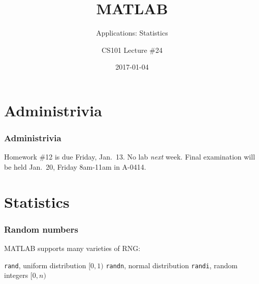 \documentclass[11pt]{beamer}
\title{MATLAB}
\subtitle{Applications:  Statistics}
\author{CS101 Lecture \#24}
\date{2017-01-04}
\begin{document}
  \setcounter{showProgressBar}{0}
  \setcounter{showSlideNumbers}{0}

\frame{\titlepage}

\setcounter{framenumber}{0}
\setcounter{showProgressBar}{1}
\setcounter{showSlideNumbers}{1}

\section{Administrivia}

\begin{frame}
  \frametitle{Administrivia}
  \Enlarge

  \begin{itemize}
  \myitem  Homework \#12 is due Friday, Jan.\ 13.  %
  \myitem  No lab \emph{next} week.  %
  \myitem  Final examination will be held Jan.\ 20, Friday 8am-11am in A-0414.  %
  \end{itemize}
\end{frame}


\section{Statistics}

\begin{frame}[fragile]
  \frametitle{Random numbers}
  \Enlarge

  \begin{enumerate}
  \myitem  MATLAB supports many varieties of RNG:
    \begin{enumerate}
    \mysubitem  \texttt{rand}, uniform distribution $[0,1)$
    \mysubitem  \texttt{randn}, normal distribution
    \mysubitem  \texttt{randi}, random integers $[0,n)$
    \end{enumerate}
  \end{enumerate}
\end{frame}
\end{document}
